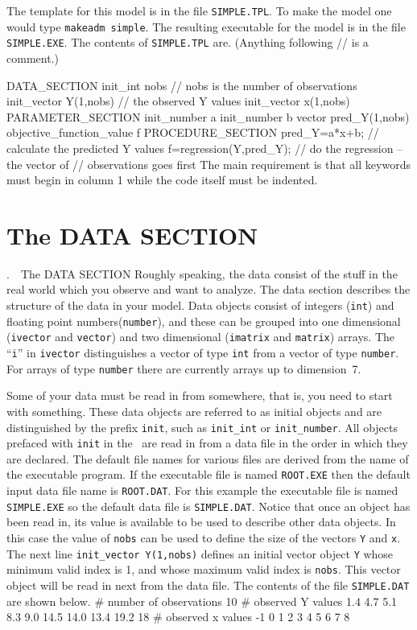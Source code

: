 \documentclass[12pt]{book}
\makeatletter
\def\mysection#1{\section{#1}{\bigbf \medbreak\noindent\number\c@chapter.\number\c@section\ \ #1\medbreak}}
\makeatother
\begin{document}
The template for this model is in the file {\tt SIMPLE.TPL}. To
make the model one would type {\tt makeadm simple}. The resulting 
executable for the model is in the file {\tt SIMPLE.EXE}.
The contents of {\tt SIMPLE.TPL} are.
(Anything following // is a comment.)

\beginexample
DATA_SECTION
  init_int nobs             // nobs is the number of observations
  init_vector Y(1,nobs)     // the observed Y values
  init_vector x(1,nobs)
PARAMETER_SECTION
  init_number a   
  init_number b   
  vector pred_Y(1,nobs)
  objective_function_value f
PROCEDURE_SECTION
  pred_Y=a*x+b;       // calculate the predicted Y values
  f=regression(Y,pred_Y);  // do the regression -- the vector of 
                           // observations goes first
\endexample
The main requirement is that all keywords must begin in column 1
while the code itself must be indented.  

\mysection{The DATA SECTION}
Roughly speaking, the data consist of the stuff in the real
world which you observe and want to analyze. The data section
describes the structure of the data in your model. Data objects 
consist of integers ({\tt int}) and floating point numbers({\tt number}),
and these can be grouped into one dimensional ({\tt ivector} and {\tt vector}) 
and two dimensional ({\tt imatrix} and {\tt matrix}) arrays.
The ``{\tt i}'' in {\tt ivector} distinguishes a vector of
type {\tt int} from a vector of type {\tt number}.
For arrays of type {\tt number} there are currently arrays up to dimension~7.

Some of your data must be read in from somewhere, that is,
you need to start with something. These data objects are 
referred to as initial objects and are
distinguished by the prefix {\tt init}, such as {\tt init\_int}
or {\tt init\_number}.
All objects prefaced with {\tt init} in  the \DS\ are 
read in from a data file in the order in which they are declared. 
The default file names for various files are derived from the
name of the executable program. If the executable file is named
{\tt ROOT.EXE} then  the default input data file name is {\tt ROOT.DAT}. 
For this example the executable file is named {\tt SIMPLE.EXE}
so the default data file is {\tt SIMPLE.DAT}.
Notice that
once an object has been read in, its value is available
to be used to describe other data objects. In this case the
value of {\tt nobs} can be used to define the size of the
vectors {\tt Y} and {\tt x}. The next line {\tt init\_vector Y(1,nobs)}
defines an initial vector object {\tt Y} whose minimum valid index is 1,
and whose maximum valid index is {\tt nobs}. This vector
object will be read in next from the data file.
The contents of the file {\tt SIMPLE.DAT} are shown below. 
\beginexample
# number of observations
     10
# observed Y values
    1.4  4.7  5.1  8.3  9.0  14.5  14.0  13.4  19.2  18 
# observed x values
    -1  0 1  2  3  4  5  6  7  8        
\endexample
\end{document}
